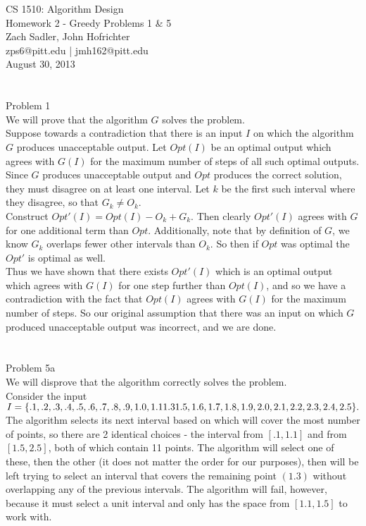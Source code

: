 \documentclass[11pt]{article}
\begin{document}
\noindent 
CS 1510: Algorithm Design\\
Homework 2 - Greedy Problems 1 \& 5\\
Zach Sadler, John Hofrichter\\
zps6@pitt.edu | jmh162@pitt.edu\\
August 30, 2013\\ 
\\ 
\\

\noindent \huge 
Problem 1\\
\normalsize
\noindent 
We will prove that the algorithm $G$ solves the problem.\\
Suppose towards a contradiction that there is an input $I$ on which the algorithm $G$ produces unacceptable output. Let $Opt(I)$ be an optimal output which agrees with $G(I)$ for the maximum number of steps of all such optimal outputs.\\
Since $G$ produces unacceptable output and $Opt$ produces the correct solution, they must disagree on at least one interval. Let $k$ be the first such interval where they disagree, so that $G_k \ne O_k$.\\
Construct $Opt'(I) = Opt(I) - O_k + G_k$. Then clearly $Opt'(I)$ agrees with $G$ for one additional term than $Opt$. Additionally, note that by definition of $G$, we know $G_k$ overlaps fewer other intervals than $O_k$. So then if $Opt$ was optimal the $Opt'$ is optimal as well.\\
Thus we have shown that there exists $Opt'(I)$ which is an optimal output which agrees with $G(I)$ for one step further than $Opt(I)$, and so we have a contradiction with the fact that $Opt(I)$ agrees with $G(I)$ for the maximum number of steps. So our original assumption that there was an input on which $G$ produced unacceptable output was incorrect, and we are done.\\
\\
\\
\noindent \huge 
Problem 5a\\
\normalsize
\noindent 
We will disprove that the algorithm correctly solves the problem.\\
Consider the input \\
$I = \{.1, .2, .3, .4, .5, .6, .7, .8, .9, 1.0, 1.1 \\
1.3\\
1.5, 1.6, 1.7, 1.8, 1.9, 2.0, 2.1, 2.2, 2.3, 2.4, 2.5 \}.$\\
The algorithm selects its next interval based on which will cover the most number of points, so there are 2 identical choices - the interval from $[.1, 1.1]$ and from $[1.5, 2.5]$, both of which contain 11 points. The algorithm will select one of these, then the other (it does not matter the order for our purposes), then will be left trying to select an interval that covers the remaining point $(1.3)$ without overlapping any of the previous intervals. The algorithm will fail, however, because it must select a unit interval and only has the space from $[1.1, 1.5]$ to work with.\\
\end{document}

